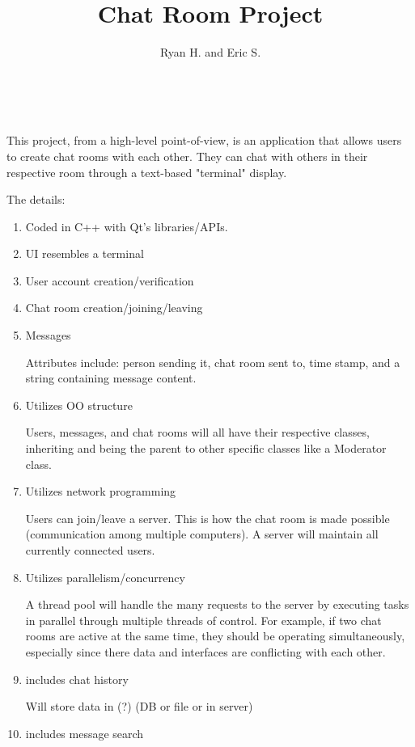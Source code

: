 \documentclass[a4paper,11pt,twoside]{article}
\title{Chat Room Project}
\author{Ryan H. and Eric S.}
\makeatletter
\renewcommand{\maketitle}{ 
  \begin{flushright} 
    {\LARGE\@title} 

    \vspace{20pt} 

    {\large\@author}
    \\\@date

    \vspace{30pt}
  \end{flushright}
}
\makeatother
\begin{document}
\maketitle
This project, from a high-level point-of-view, is an application that allows users to create chat rooms with each other. They can chat with others in their respective room through a text-based "terminal" display.

The details:
\begin{enumerate}
  \item Coded in C++ with Qt's libraries/APIs. %
  \item UI resembles a terminal
  \item User account creation/verification
  \item Chat room creation/joining/leaving
  \item Messages

    Attributes include: person sending it, chat room sent to, time stamp, and a string containing message content.

  \item Utilizes OO structure

    Users, messages, and chat rooms will all have their respective classes, inheriting and being the parent to other specific classes like a Moderator class.

  \item Utilizes network programming %

    Users can join/leave a server. This is how the chat room is made possible (communication among multiple computers). A server will maintain all currently connected users.

  \item Utilizes parallelism/concurrency

    A thread pool will handle the many requests to the server by executing tasks in parallel through multiple threads of control. For example, if two chat rooms are active at the same time, they should be operating simultaneously, especially since there data and interfaces are conflicting with each other.

  \item includes chat history

    Will store data in (?) (DB or file or in server)

  \item includes message search
\end{enumerate}
\end{document}
